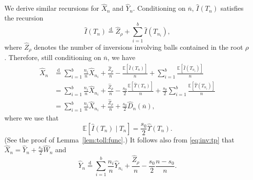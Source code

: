 \documentclass[11pt]{article}
\newcommand{\E}[1]{\mathbb{E} \left[#1\right]}
\newcommand{\ball}[1]{\hat{#1}}
\def\bI{\ball{I}}
\def\bX{\ball{X}}
\def\bY{\ball{Y}}
\def\bW{\ball{W}}
\def\bU{\ball{\Upsilon}}
\def\bZ{\ball{Z}}
\def\r{\rho}
\numberwithin{theorem}{section}
\theoremstyle{definition}
\newcommand{\nBar}{\overline{n}}
\newcommand{\Toll}{D}
\newcommand{\bToll}{\ball{\Toll}}
\newcommand{\bTollN}{\bToll_{n}}
\numberwithin{equation}{section}
\newcommand{\refL}[1]{Lemma~\ref{#1}}
\newcommand\eqdd{\overset{\mathrm{d}}{=}}
\begin{document}
We derive similar recursions for \(\bX_{n}\) and \(\bY_{n}\).
Conditioning on \(\nBar\), \(\bI(T_{n})\) satisfies the recursion
\begin{equation}\label{eq:ballrecursion}
\bI(T_n) \eqdd \bZ_\r + \sum_{i=1}^b \bI(T_{n_i}),
\end{equation}
where $\bZ_\r$ denotes the number of inversions involving balls contained in the root $\r$. 
Therefore, still conditioning on \(\nBar\), we have
\begin{align}
\bX_n 
&
\eqdd 
\sum_{i=1}^b \frac{n_i}{n} \bX_{n_i} 
+ 
\frac{\bZ_{\rho}}{n} 
-
\frac{\E{\bI(T_n)}}{n}
+ 
\sum_{i=1}^b \frac{\E{\bI(T_{n_{i}})}}{n}
\\
&
=
\sum_{i=1}^b \frac{n_i}{n} \bX_{n_i} 
+ 
\frac{\bZ_{\rho}}{n} 
- 
\frac{s_{0}}{2} \frac{\E{\bU(T_n)}}{n}
+ 
\frac{s_{0}}{2}\sum_{i=1}^b \frac{\E{\bU(T_{n_{i}})}}{n}
\\
&
=
\sum_{i=1}^b \frac{n_i}{n} \bX_{n_i} 
+ 
\frac{\bZ_{\rho}}{n} 
+ 
\frac{s_0}{2}\bTollN(\nBar)
,
\label{eq:n:tollfunction:ball:X}
\end{align}
where we use that
\begin{equation}
    \E{ \bI(T_n) \mid T_n}
    =
    \frac{s_{0}}{2}
    \bU(T_n)
    .
    \label{eq:inv:tp}
\end{equation}
(See the proof of \refL{lem:toll:func}.)
It follows also from \eqref{eq:inv:tp} that \(\bX_{n} = \bY_{n} + \frac{s_0}{2} \bW_{n}\) and
\begin{equation}
\bY_n 
\eqdd 
\sum_{i=1}^b \frac{n_i}{n} \bY_{n_i} 
+ 
\frac{\bZ_{\rho}}{n} 
-
\frac{s_0}{2} \frac{n-s_0}{n}
.
\label{eq:n:tollfunction:ball:Y}
\end{equation}
\end{document}

